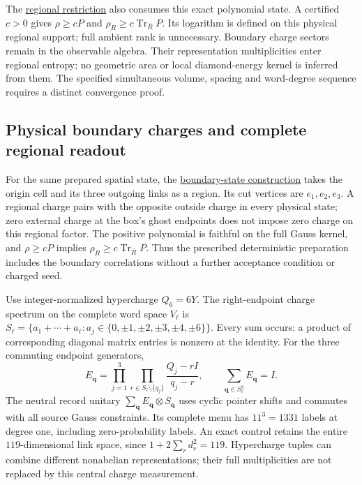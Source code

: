 The \href{https://github.com/FloatingPragma/observer-patch-holography/blob/main/model/particle_spatial_modular_response/PROOF.md}{regional restriction}
also consumes this exact polynomial state. A certified $c>0$ gives
$\rho\ge cP$ and $\rho_R\ge c\operatorname{Tr}_{\bar R}P$.
Its logarithm is defined on this physical regional support; full ambient
rank is unnecessary. Boundary charge sectors remain in the observable
algebra. Their representation multiplicities enter regional entropy;
no geometric area or local diamond-energy kernel is inferred from them.
The specified simultaneous volume, spacing and word-degree sequence
requires a distinct convergence proof.

\subsection{Physical boundary charges and complete regional readout}

For the same prepared spatial state, the
\href{https://github.com/FloatingPragma/observer-patch-holography/blob/main/model/particle_physical_boundary_state/PROOF.md}{boundary-state construction}
takes the origin cell and its three outgoing links as a region. Its cut
vertices are $e_1,e_2,e_3$. A regional charge pairs with the opposite
outside charge in every physical state; zero external charge at the
box's ghost endpoints does not impose zero charge on this regional
factor. The positive polynomial is faithful on the full Gauss kernel,
and $\rho\ge cP$ implies $\rho_R\ge c\operatorname{Tr}_{\bar R}P$.
Thus the prescribed deterministic preparation includes the boundary
correlations without a further acceptance condition or charged seed.

Use integer-normalized hypercharge $Q_6=6Y$. The right-endpoint charge
spectrum on the complete word space $V_\ell$ is
$S_\ell=\{a_1+\cdots+a_\ell:a_j\in
\{0,\pm1,\pm2,\pm3,\pm4,\pm6\}\}$.
Every sum occurs: a product of corresponding diagonal matrix entries is
nonzero at the identity. For the three commuting endpoint generators,
\[
 E_{\boldsymbol q}=\prod_{j=1}^3
       \prod_{r\in S_\ell\setminus\{q_j\}}
           \frac{Q_j-rI}{q_j-r},\qquad
 \sum_{\boldsymbol q\in S_\ell^3}E_{\boldsymbol q}=I.
\]
The neutral record unitary $\sum_{\boldsymbol q}E_{\boldsymbol q}
\otimes S_{\boldsymbol q}$ uses cyclic pointer shifts and commutes with
all source Gauss constraints. Its complete menu has $11^3=1331$ labels
at degree one, including zero-probability labels. An exact control retains
the entire $119$-dimensional link space, since
$1+2\sum_r d_r^2=119$. Hypercharge tuples can combine different
nonabelian representations; their full multiplicities are not replaced
by this central charge measurement.

